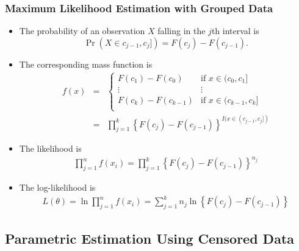 \documentclass{beamer}
\begin{document}
\begin{frame}%
\frametitle{Maximum Likelihood Estimation with Grouped Data}
\begin{itemize}
\item The probability of an observation $X$ falling in the $j$th interval is
$$\Pr\left(X \in c_{j-1}, c_j]\right) = F(c_j) - F(c_{j-1}).$$
\item The corresponding mass function is
\begin{eqnarray*}
f(x) &=&
\begin{cases}
F(c_1) - F(c_{0}) &   \textrm{if~} x \in (c_{0}, c_1]\\
\vdots & \vdots \\
F(c_k) - F(c_{k-1}) &   \textrm{if~} x \in (c_{k-1}, c_k]\\
\end{cases} \\
&=& \prod_{j=1}^k \left\{F(c_j) - F(c_{j-1})\right\}^{I(x \in (c_{j-1}, c_j])}
\end{eqnarray*}
\item The likelihood is
\begin{eqnarray*}
\prod_{j=1}^n f(x_i) = \prod_{j=1}^k \left\{F(c_j) - F(c_{j-1})\right\}^{n_j}
\end{eqnarray*}
\item The log-likelihood is
\begin{eqnarray*}
L(\theta) = \ln \prod_{j=1}^n f(x_i) = \sum_{j=1}^k n_j \ln \left\{F(c_j) - F(c_{j-1})\right\}
\end{eqnarray*}
\end{itemize}
\end{frame}

\subsection{Parametric Estimation Using Censored Data}
\end{document}
